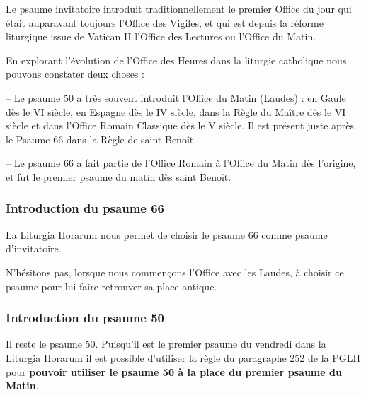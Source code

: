 \documentclass[oneside, 10pt]{article}
\begin{document}

\newpage
{}


Le psaume invitatoire introduit traditionnellement le premier Office du jour qui était auparavant toujours l'Office des Vigiles, et qui est depuis la réforme liturgique issue de Vatican II l'Office des Lectures ou l'Office du Matin.

En explorant l'évolution de l'Office des Heures dans la liturgie catholique nous pouvons constater deux choses :

-- Le psaume 50 a très souvent introduit l'Office du Matin (Laudes) : en Gaule dès le VI siècle, en Espagne dès le IV siècle, dans la Règle du Maître dès le VI siècle et dans l'Office Romain Classique dès le V siècle. Il est présent juste après le Psaume 66 dans la Règle de saint Benoît.

-- Le psaume 66 a fait partie de l'Office Romain à l'Office du Matin dès l'origine, et fut le premier psaume du matin dès saint Benoît.

\subsubsection*{Introduction du psaume 66}

La Liturgia Horarum nous permet de choisir le psaume 66 comme psaume d'invitatoire.

N'hésitons pas, lorsque nous commençons l'Office avec les Laudes, à choisir ce psaume pour lui faire retrouver sa place antique.

\subsubsection*{Introduction du psaume 50}

Il reste le psaume 50. Puisqu'il est le premier psaume du vendredi dans la Liturgia Horarum il est possible d'utiliser la règle du paragraphe 252 de la PGLH pour\textbf{ pouvoir utiliser le psaume 50 à la place du premier psaume du Matin}.
\end{document}
